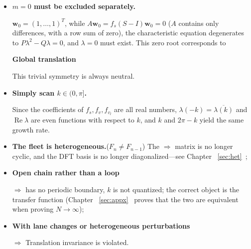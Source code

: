\documentclass[11pt,a4paper,openany]{book}
\numberwithin{equation}{chapter}
\numberwithin{figure}{chapter}
\numberwithin{table}{chapter}
\begin{document}
\begin{itemize}[leftmargin=1.4em,itemsep=4pt]
\item \textbf{$m=0$ must be excluded separately.}




 $\mathbf w_0=(1,\dots,1)^T$, while $A\mathbf w_0=f_s(S-I)\mathbf w_0=0$ ($A$ contains only differences, with a row sum of zero), the characteristic equation degenerates to $P\lambda^2-Q\lambda=0$, and $\lambda=0$ must exist. This zero root corresponds to




\textbf{Global translation}




This trivial symmetry is always neutral.







\item \textbf{Simply scan $k\in(0,\pi]$.}




Since the coefficients of $f_s,f_v,f_{v_l}$ are all real numbers, $\lambda(-k)=\overline{\lambda(k)}$ and $\operatorname{Re}\lambda$ are even functions with respect to $k$, and $k$ and $2\pi-k$ yield the same growth rate.







\end{itemize}

\begin{tcolorbox}[notebox,title=\textbf{When does this assumption fail?}]
\begin{itemize}[leftmargin=1.2em,itemsep=2pt]
\item \textbf{The fleet is heterogeneous.}($F_n\ne F_{n-1}$) The $\Rightarrow$ matrix is no longer cyclic, and the DFT basis is no longer diagonalized—see Chapter ~\ref{sec:het}~;







\item \textbf{Open chain rather than a loop}




$\Rightarrow$ has no periodic boundary, $k$ is not quantized; the correct object is the transfer function (Chapter ~\ref{sec:appx}~ proves that the two are equivalent when proving $N\to\infty$);







\item \textbf{With lane changes or heterogeneous perturbations}




 $\Rightarrow$ Translation invariance is violated.







\end{itemize}
\end{tcolorbox}
\end{document}

